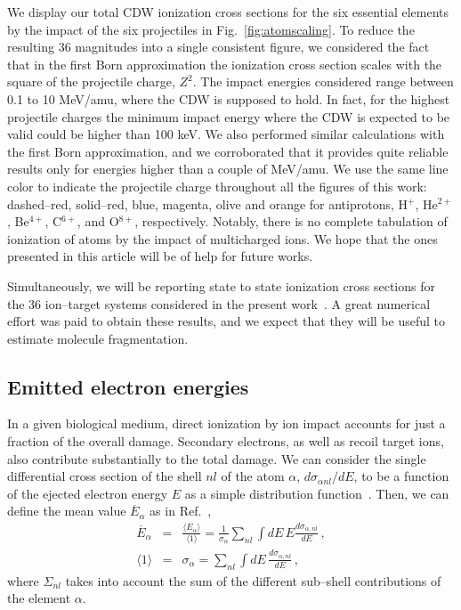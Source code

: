 \documentclass[10pt,showpacs,twocolumn]{revtex4}
\begin{document}
We display our total CDW ionization cross sections for the six essential 
elements by the impact of the six projectiles in Fig.~\ref{fig:atomscaling}.
To reduce the resulting 36 magnitudes into a single consistent 
figure, we considered the fact that in the first Born approximation
the ionization cross section scales with the square of the projectile 
charge, $Z^{2}$. The impact energies considered 
range between 0.1 to 10 MeV/amu, where the CDW is supposed 
to hold. In fact, for the highest projectile charges the minimum 
impact energy where the CDW is expected to be valid could be 
higher than 100 keV. We also performed similar calculations with the 
first Born approximation, and we corroborated that it provides quite 
reliable results only for energies higher than a couple of MeV/amu. 
We use the same line color to indicate the projectile charge throughout 
all the figures of this work: dashed--red, solid--red, blue, magenta, 
olive and orange for antiprotons, H$^{+}$, He$^{2+}$, Be$^{4+}$, 
C$^{6+}$, and O$^{8+}$, respectively. Notably, there is no complete 
tabulation of ionization of atoms by the impact of multicharged ions. 
We hope that the ones presented in this article will be of help for 
future works.

Simultaneously, we will be reporting state to state ionization cross 
sections for the 36 ion--target systems considered in the present 
work~\cite{miraglia2019}. A great numerical effort was paid to obtain 
these results, and we expect that they will be useful to estimate 
molecule fragmentation.

\subsection{Emitted electron energies}
\label{subsec:meanener}

In a given biological medium, direct ionization by ion impact accounts 
for just a fraction of the overall damage. Secondary electrons, as well 
as recoil target ions, also contribute substantially to the total damage. 
We can consider the single differential cross section of the shell 
$nl$ of the atom $\alpha$, $d\sigma_{\alpha nl}/dE$, to be a function 
of the ejected electron energy $E$ as a simple distribution 
function~\cite{surdutovic2018}. Then, we can define the mean value 
$\overline{E}_{\alpha}$ as in Ref.~\cite{abril2015},
\begin{eqnarray}
\overline{E}_{\alpha} &=&\frac{\langle E_{\alpha}\rangle}{\langle
1\rangle}=\frac{1}{\sigma_{\alpha}}\sum\limits_{nl}\int dE\,E
\frac{d\sigma_{\alpha,nl}}{dE}\,,  
\label{40} \\
\langle 1\rangle &=&\sigma_{\alpha}=\sum\limits_{nl}\int dE\,
\frac{d\sigma_{\alpha,nl}}{dE}\,,  
\label{50}
\end{eqnarray}
where $\Sigma_{nl}$ takes into account the sum of the different 
sub--shell contributions of the element $\alpha$.
\end{document}
